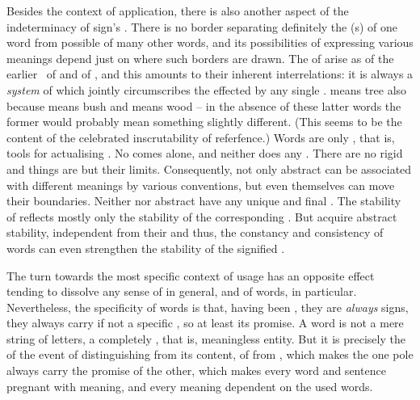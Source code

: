 Besides the context of application, there is also another aspect of the
indeterminacy of sign's .  There is no  border
separating definitely the (s) of one word from possible
 of many other words, and its possibilities of expressing various
meanings depend just on where such borders are drawn. {The  of
   arise as  of the earlier \nexuss\ of 
  and of , and this amounts to their inherent interrelations:
  it is always a {\em system} of  which jointly circumscribes the
   effected by any single .  means {tree}
  also because  means {bush} and  means {wood} -- in the
  absence of these latter words the former would probably mean something
  slightly different.} (This seems to be the content of the celebrated
inscrutability of referfence.) Words are only , that is, tools for
actualising . No  comes alone, and neither does
any . There are no rigid  and things are but their
limits. Consequently, not only abstract  can be associated with
different meanings by various conventions, but even  themselves can
move their boundaries. Neither  nor abstract  have any
unique and final .  The stability of  reflects mostly
only the stability of the corresponding .  But  acquire abstract stability, independent from their  and
thus, the constancy and consistency of words can even strengthen the stability
of the signified .  

\pa
The turn towards the most specific context of  usage has an opposite
effect tending 
to dissolve any  sense of  in general, and of words,
in particular. 
Nevertheless, the specificity of words is that, having been , they are {\em always} signs, they always carry if not a specific
, so at least its promise. A word is not a mere string of letters, 
a completely , that is, meaningless entity. But 
it is precisely the  of the
event of distinguishing from its content, of  from , which
makes the one  pole always carry the promise of the other, which
makes every word and sentence pregnant with meaning, and every 
meaning dependent on the used words. 

